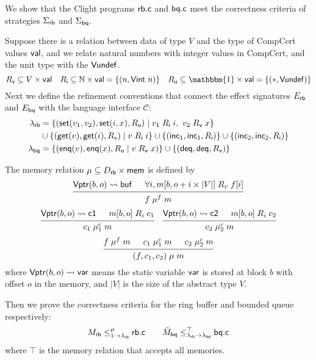 \documentclass[acmsmall,review,anonymous]{acmart}\settopmatter{printfolios=true,printccs=false,printacmref=false}
\begin{document}
\begin{example}
  We show that the Clight programs $ \mathsf{rb.c} $ and $ \mathsf{bq.c} $
  meet the correctness criteria of strategies
  $\Sigma_{ \mathsf{rb} }$ and $\Sigma_{ \mathsf{bq} }$.

  Suppose there is a relation between
  data of type $V$ and
  the type of CompCert values $ \mathsf{val} $,
  and we relate natural numbers with integer values in CompCert,
  and the unit type with the $ \mathsf{Vundef} $.
  \[
    R_\kw{v} \subseteq V \times \kw{val}
    \quad
    R_\kw{i} \subseteq \mathbb{N} \times \kw{val} = \{(n, \kw{Vint}\ n) \}
    \quad
    R_\kw{u} \subseteq \mathbbm{1} \times \kw{val} = \{(*, \kw{Vundef}) \}
  \]
  Next we define the refinement conventions that connect the effect signatures
  $E_{ \mathsf{rb} }$ and $E_{ \mathsf{bq} }$ with the language interface $\mathcal{C}$:
  \begin{align*}
    \lambda_{ \mathsf{rb} }
    & = \{ ( \mathsf{set} (v_1, v_2),  \mathsf{set} (i, x), R_{ \mathsf{u} }) \mid
      v_1 \mathrel{R_{ \mathsf{i} }}i,\ v_2\mathrel{R_{ \mathsf{v} }}x\} \\
    & \cup \{ ( \mathsf{get} (v),  \mathsf{get} (i), R_{ \mathsf{v} })\mid
      v\mathrel{R_{ \mathsf{i} }}i\} \cup \{ ( \mathsf{inc_1} ,  \mathsf{inc_1} , R_{ \mathsf{i} })\}
      \cup \{ ( \mathsf{inc_2} ,  \mathsf{inc_2} , R_{ \mathsf{i} })\}\\
    \lambda_{ \mathsf{bq} }
    & = \{ ( \mathsf{enq} (v),  \mathsf{enq} (x), R_{ \mathsf{u} } \mid
      v\mathrel{R_{ \mathsf{v} }}x)\} \cup \{ ( \mathsf{deq} ,  \mathsf{deq} , R_{ \mathsf{v} })\}
  \end{align*}

  The memory relation
  $\mu \subseteq D_{ \mathsf{rb} } \times  \mathsf{mem} $
  is defined by
  \[
    \begin{prooftree}
      \hypo{\kw{Vptr}(b,o) \leadsto \kw{buf}}
      \hypo{\forall i, m[b,o + i\times |V|] \mathrel{R_v} f[i]}
      \infer2{f \mathrel{\mu^f} m}
    \end{prooftree}
  \]
  \[
    \begin{prooftree}
      \hypo{\kw{Vptr}(b, o) \leadsto \kw{c1}}
      \hypo{m[b,o] \mathrel{R_i} c_1}
      \infer2{c_1 \mathrel{\mu^c_1} m}
    \end{prooftree}
    \quad
    \begin{prooftree}
      \hypo{\kw{Vptr}(b, o) \leadsto \kw{c2}}
      \hypo{m[b,o] \mathrel{R_i} c_2}
      \infer2{c_2 \mathrel{\mu^c_2} m}
    \end{prooftree}
  \]
  \[
    \begin{prooftree}
      \hypo{f \mathrel{\mu^f} m}
      \hypo{c_1 \mathrel{\mu^c_1} m}
      \hypo{c_2 \mathrel{\mu^c_2} m}
      \infer3{(f, c_1, c_2) \mathrel{\mu} m}
    \end{prooftree}
  \]
  where $ \mathsf{Vptr} (b,o) \leadsto  \mathsf{var} $
  means the static variable $ \mathsf{var} $
  is stored at block $b$ with offset $o$
  in the memory,
  and $|V|$ is the size of the abstract type $V$.

  Then we prove the correctness criteria for the ring buffer
  and bounded queue respectively:
  \[
    M_{ \mathsf{rb} } \le^\mu_{1 \rightarrow \lambda_{ \mathsf{rb} }}  \mathsf{rb.c} 
    \qquad
    \tilde{M}_{ \mathsf{bq} } \le^\top_{\lambda_{ \mathsf{rb} } \rightarrow \lambda_{ \mathsf{bq} }}  \mathsf{bq.c} 
  \]
  where $\top$ is the memory relation that accepts all memories.
\end{example}
\end{document}
